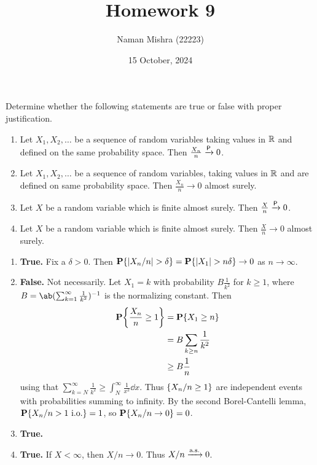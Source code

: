 \documentclass[12pt]{article}
\title{Homework 9}
\author{Naman Mishra (22223)}
\date{15 October, 2024}
\begin{document}
\maketitle

\begin{problem*}
    Determine whether the following statements are true or false with proper
    justification.
    \begin{enumerate}
        \item Let $X_1, X_2, \dots$ be a sequence of \iid random variables
        taking values in $\mathbb{R}$ and defined on the same probability space.
        Then $\frac{X_n}{n} \xrightarrow{\mathsf{P}} 0$.
        \item Let $X_1, X_2, \dots$ be a sequence of \iid random
        variables, taking values in $\mathbb{R}$ and are defined on same probability
        space.
        Then $\frac{X_n}{n} \to 0$ almost surely.
        \item Let $X$ be a random variable which is finite almost surely.
        Then $\frac Xn \xrightarrow{\mathsf{P}} 0$.
        \item Let $X$ be a random variable which is finite almost surely.
        Then $\frac Xn \to 0$ almost surely.
    \end{enumerate}
\end{problem*}
\begin{solution} \leavevmode
    \begin{enumerate}
        \item \textbf{True.}
        Fix a $\delta > 0$.
        Then $\operatorname{\mathbf P}\{\lvert X_n/n\rvert > \delta\} = \operatorname{\mathbf P}\{\lvert X_1\rvert > n\delta\}
        \to 0$ as $n \to \infty$.
        \item \textbf{False.} Not necessarily.
        Let $X_1 = k$ with probability $B \frac1{k^2}$ for $k \ge 1$,
        where $B = \ab(\sum_{k=1}^\infty \frac1{k^2})^{-1}$ is the
        normalizing constant.
        Then \begin{align*}
            \P\set*{\frac{X_n}{n} \ge 1} &= \P\set{X_1 \ge n} \\
                &= B \sum_{k \ge n} \frac1{k^2} \\
                &\ge B \frac1n
        \end{align*} using that
        $\sum_{k=N}^\infty \frac1{k^2} \ge \int_N^\infty \frac1{x^2} \dd x$.
        Thus $\{X_n/n \ge 1\}$ are independent events with
        probabilities summing to infinity.
        By the second Borel-Cantelli lemma,
        $\operatorname{\mathbf P}\{X_n/n > 1 \text{ i.o.}\} = 1$, so
        $\operatorname{\mathbf P}\{X_n/n \to 0\} = 0$.
        \item \textbf{True.}
        \item \textbf{True.}
        If $X < \infty$, then $X/n \to 0$.
        Thus $X/n \xrightarrow{\text{a.s.}} 0$. \qedhere
    \end{enumerate}
\end{solution}
\end{document}
